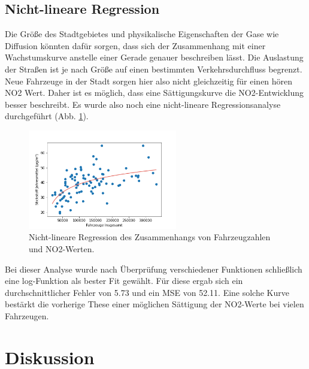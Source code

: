 \documentclass[11pt,a4paper,oneside,german]{article}
\begin{document}
	\subsection{Nicht-lineare Regression}
	
	Die Größe des Stadtgebietes und physikalische Eigenschaften der Gase wie Diffusion könnten dafür sorgen, dass sich der Zusammenhang mit einer Wachstumskurve anstelle einer Gerade genauer beschreiben lässt. Die Auslastung der Straßen ist je nach Größe auf einen bestimmten Verkehrsdurchfluss begrenzt. Neue Fahrzeuge in der Stadt sorgen hier also nicht gleichzeitig für einen hören NO2 Wert. Daher ist es möglich, dass eine Sättigungskurve die NO2-Entwicklung besser beschreibt. Es wurde also noch eine nicht-lineare Regressionsanalyse durchgeführt (Abb. \ref{fig:nonlinreg}).
	
	\begin{figure}[H]
	\centering
	\includegraphics[width=6.5cm]{non_linear_regression_1.png}
	\caption{Nicht-lineare Regression des Zusammenhangs von Fahrzeugzahlen und NO2-Werten.}
	\label{fig:nonlinreg}
	\end{figure}
	
	Bei dieser Analyse wurde nach Überprüfung verschiedener Funktionen schließlich eine log-Funktion als bester Fit gewählt. Für diese ergab sich ein durchschnittlicher Fehler von 5.73 und ein MSE von 52.11. Eine solche Kurve bestärkt die vorherige These einer möglichen Sättigung der NO2-Werte bei vielen Fahrzeugen.

	
	\section{Diskussion}
	
\end{document}
